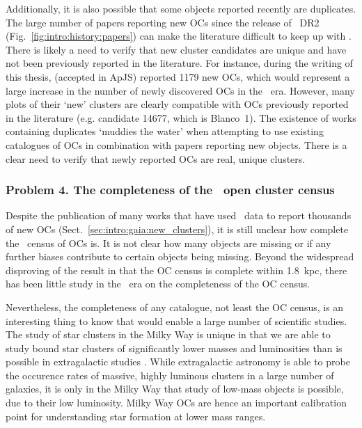 Additionally, it is also possible that some objects reported recently are duplicates. The large number of papers reporting new OCs since the release of \gaia\ DR2 (Fig.~\ref{fig:intro:history:papers}) can make the literature difficult to keep up with \citep{cantat-gaudin_milky_2022}. There is likely a need to verify that new cluster candidates are unique and have not been previously reported in the literature. For instance, during the writing of this thesis, \cite{chi_blind_search_2023} (accepted in ApJS) reported 1179 new OCs, which would represent a large increase in the number of newly discovered OCs in the \gaia\ era. However, many plots of their `new' clusters are clearly compatible with OCs previously reported in the literature (e.g. candidate 14677, which is Blanco~1). The existence of works containing duplicates `muddies the water' when attempting to use existing catalogues of OCs in combination with papers reporting new objects. There is a clear need to verify that newly reported OCs are real, unique clusters. 


\subsubsection{Problem 4. The completeness of the \gaia\ open cluster census}
\label{sec:intro:aims:issues:completeness}

Despite the publication of many works that have used \gaia\ data to report thousands of new OCs (Sect.~\ref{sec:intro:gaia:new_clusters}), it is still unclear how complete the \gaia\ census of OCs is. It is not clear how many objects are missing or if any further biases contribute to certain objects being missing. Beyond the widespread disproving of the result in \cite{kharchenko_global_2013} that the OC census is complete within 1.8~kpc, there has been little study in the \gaia\ era on the completeness of the OC census.

Nevertheless, the completeness of any catalogue, not least the OC census, is an interesting thing to know that would enable a large number of scientific studies. The study of star clusters in the Milky Way is unique in that we are able to study bound star clusters of significantly lower masses and luminosities than is possible in extragalactic studies \citep{portegies_zwart_young_2010}. While extragalactic astronomy is able to probe the occurence rates of massive, highly luminous clusters in a large number of galaxies, it is only in the Milky Way that study of low-mass objects is possible, due to their low luminosity. Milky Way OCs are hence an important calibration point for understanding star formation at lower mass ranges.

